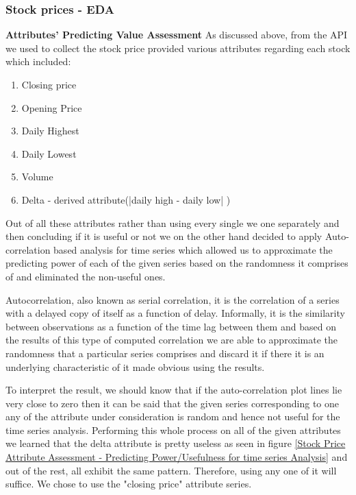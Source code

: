 \documentclass[sigconf, nonacm]{acmart}
\begin{document}
\subsubsection{Stock prices - EDA}
\textbf{Attributes' Predicting Value Assessment }
As discussed above, from the API we used to collect the stock price provided various attributes regarding each stock which included:
\begin{enumerate}
    \item Closing price
    \item Opening Price
    \item Daily Highest
    \item Daily Lowest
    \item Volume
    \item Delta - derived attribute(|daily high - daily low| )
\end{enumerate}
Out of all these attributes rather than using every single we one separately and then concluding if it is useful or not we on the other hand decided to apply Auto-correlation based analysis for time series which allowed us to approximate the predicting power of each of the given series based on the randomness it comprises of and eliminated the non-useful ones. \newline

Autocorrelation, also known as serial correlation, it is the correlation of a series with a delayed copy of itself as a function of delay. Informally, it is the similarity between observations as a function of the time lag between them and based on the results of this type of computed correlation we are able to approximate the randomness that a particular series comprises and discard it if there it is an underlying characteristic of it made obvious using the results. \newline

To interpret the result, we should know that if the auto-correlation plot lines lie very close to zero then it can be said that the given series corresponding to one any of the attribute under consideration is random and hence not useful for the time series analysis. Performing this whole process on all of the given attributes we learned that the delta attribute is pretty useless as seen in figure \ref{Stock Price Attribute Assessment - Predicting Power/Usefulness for time series Analysis} and out of the rest, all exhibit the same pattern. Therefore, using any one of it will suffice. We chose to use the "closing price" attribute series. 
\end{document}
